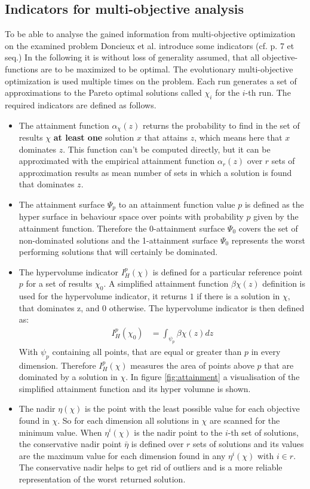 \documentclass[12pt,twoside]{article}
\theoremstyle{plain}
\theoremstyle{definition}
\theoremstyle{remark}
\begin{document}
\subsection{Indicators for multi-objective analysis}
\label{back:indicators}
To be able to analyse the gained information from multi-objective optimization on the examined problem Doncieux et al. introduce some indicators (cf. \cite{doncieux2015multi} p. 7 et seq.)
In the following it is without loss of generality assumed, that all objective-functions are to be maximized to be optimal.
The evolutionary multi-objective optimization is used multiple times on the problem. Each run generates a set of approximations to the Pareto optimal solutions called $\chi_i$ for the $i$-th run.
The required indicators are defined as follows.
\begin{itemize}
	\item The attainment function $\alpha_\chi(z)$ returns the probability to find in the set of results $\chi$ \textbf{at least one} solution $x$ that attains $z$, which means here that $x$ dominates $z$. This function can't be computed directly, but it can be approximated with the empirical attainment function $\alpha_r(z)$ over $r$ sets of approximation results as mean number of sets in which a solution is found that dominates $z$.
	\item The attainment surface $\Psi_p$ to an attainment function value $p$ is defined as the hyper surface in behaviour space over points with probability $p$ given by the attainment function.
	Therefore the 0-attainment surface $\Psi_0$ covers the set of non-dominated solutions and the 1-attainment surface $\Psi_0$ represents the worst performing solutions that will certainly be dominated.
	\item The hypervolume indicator $I^p_H(\chi)$ is defined for a particular reference point $p$ for a set of results $\chi_0$. A simplified attainment function $\beta\chi(z)$ definition is used for the hypervolume indicator, it returns $1$ if there is a solution in $\chi$, that dominates z, and $0$ otherwise. The hypervolume indicator is then defined as:
	\begin{align*}
		I^p_H(\chi_0) &= \int_{\psi_p}\beta\chi(z) dz
	\end{align*}
	With $\psi_p$ containing all points, that are equal or greater than $p$ in every dimension.
	Therefore $I^p_H(\chi)$ measures the area of points above $p$ that are dominated by a solution in $\chi$.
	In figure \ref{fig:attainment} a visualisation of the simplified attainment function and its hyper volumne is shown.
	\item The nadir $\eta(\chi)$ is the point with the least possible value for each objective found in $\chi$. So for each dimension all solutions in $\chi$ are scanned for the minimum value.
	When $\eta^i(\chi)$ is the nadir point to the $i$-th set of solutions, the conservative nadir point $\bar{\eta}$ is defined over $r$ sets of solutions and its values are the maximum value for each dimension found in any $\eta^i(\chi)$ with $i\in r$. The conservative nadir helps to get rid of outliers and is a more reliable representation of the \glqq worst\grqq{} returned solution.
\end{itemize}
\end{document}
